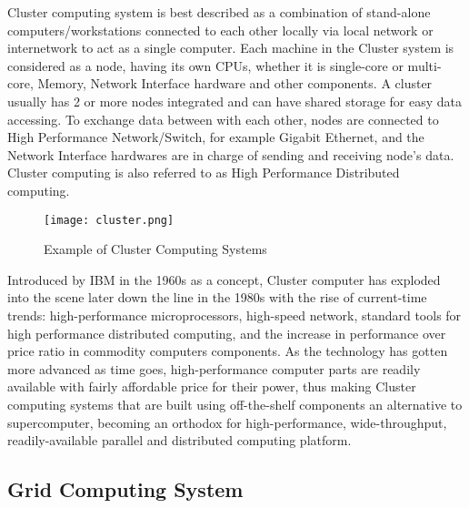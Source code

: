 Cluster computing system is best described as a combination of stand-alone computers/workstations connected to each other locally via local network or internetwork to act as a single computer. Each machine in the Cluster system is considered as a node, having its own CPUs, whether it is single-core or multi-core, Memory, Network Interface hardware and other components. A cluster usually has 2 or more nodes integrated and can have shared storage for easy data accessing. To exchange data between with each other, nodes are connected to High Performance Network/Switch, for example Gigabit Ethernet, and the Network Interface hardwares are in charge of sending and receiving node's data. Cluster computing is also referred to as High Performance Distributed computing. \\
\begin{figure}[H]
\texttt{[image: cluster.png]}
\centering
\caption{Example of Cluster Computing Systems}
\end{figure}
Introduced by IBM in the 1960s as a concept, Cluster computer has exploded into the scene later down the line in the 1980s with the rise of current-time trends: high-performance microprocessors, high-speed network, standard tools for high performance distributed computing, and the increase in performance over price ratio in commodity computers components. As the technology has gotten more advanced as time goes, high-performance computer parts are readily available with fairly affordable price for their power, thus making Cluster computing systems that are built using off-the-shelf components an alternative to supercomputer, becoming an orthodox for high-performance, wide-throughput, readily-available parallel and distributed computing platform. \\

\subsection{Grid Computing System}

